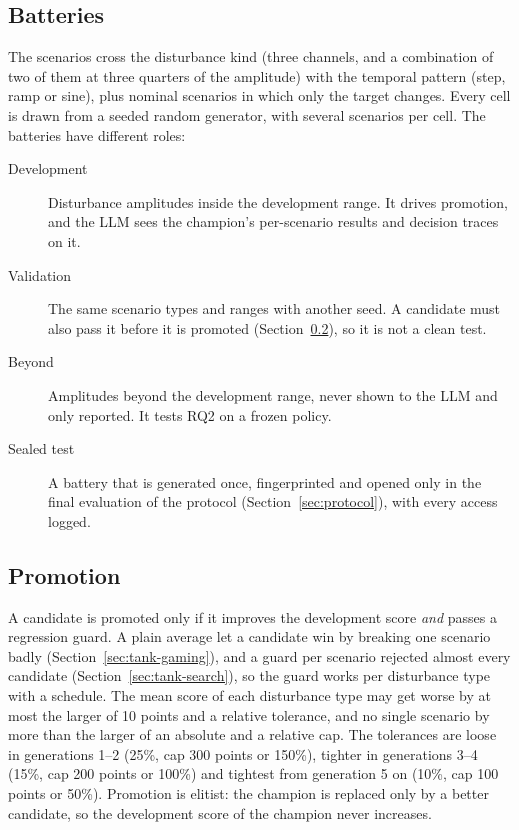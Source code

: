 \subsection{Batteries}
\label{sec:batteries}
The scenarios cross the disturbance kind (three channels, and a combination
of two of them at three quarters of the amplitude) with the temporal pattern
(step, ramp or sine), plus nominal scenarios in which only the target changes.
Every cell is drawn from a seeded random generator, with several scenarios per
cell. The batteries have different roles:
\begin{description}
\item[Development] Disturbance amplitudes inside the development range.
  It drives promotion, and the LLM sees the champion's per-scenario results
  and decision traces on it.
\item[Validation] The same scenario types and ranges with another seed. A
  candidate must also pass it before it is promoted
  (Section~\ref{sec:promotion}), so it is not a clean test.
\item[Beyond] Amplitudes beyond the development range, never shown to the
  LLM and only reported. It tests RQ2 on a frozen policy.
\item[Sealed test] A battery that is generated once, fingerprinted and opened
  only in the final evaluation of the protocol (Section~\ref{sec:protocol}),
  with every access logged.
\end{description}

\subsection{Promotion}
\label{sec:promotion}
A candidate is promoted only if it improves the development score \emph{and}
passes a regression guard. A plain average let a candidate win by breaking
one scenario badly (Section~\ref{sec:tank-gaming}), and a guard per scenario
rejected almost every candidate (Section~\ref{sec:tank-search}), so the guard
works per disturbance type with a schedule. The mean score of each
disturbance type may get worse by at most the larger of 10 points and a
relative tolerance, and no single scenario by more than the larger of an
absolute and a relative cap.
The tolerances are loose in generations 1--2 (25\%, cap 300 points or 150\%),
tighter in generations 3--4 (15\%, cap 200 points or 100\%) and tightest from
generation 5 on (10\%, cap 100 points or 50\%). Promotion is elitist: the
champion is replaced only by a better candidate, so the development score of
the champion never increases.

